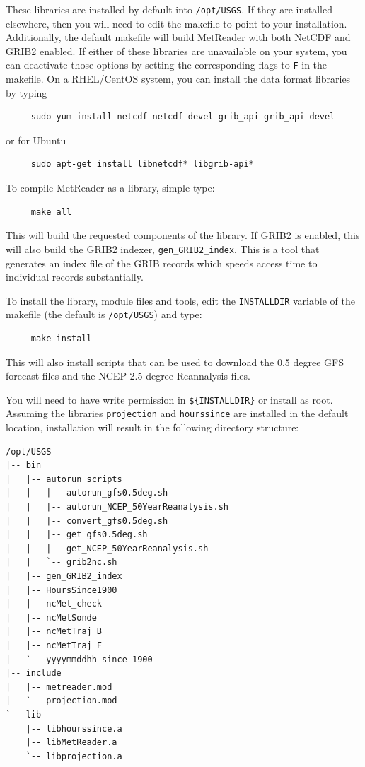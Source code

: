 \documentclass[11pt]{article}   %
\begin{document}
These libraries are installed by default into \texttt{/opt/USGS}.  If they are
installed elsewhere, then you will need to edit the makefile to point to your
installation.
Additionally, the default makefile will build MetReader with both NetCDF and GRIB2
enabled.  If either of these libraries are unavailable on your system, you can
deactivate those options by setting the corresponding flags to \texttt{F} in the makefile.
On a RHEL/CentOS system, you can install the data format libraries by typing
\begin{verbatim}
     sudo yum install netcdf netcdf-devel grib_api grib_api-devel
\end{verbatim}
or for Ubuntu
\begin{verbatim}
     sudo apt-get install libnetcdf* libgrib-api*
\end{verbatim}
To compile MetReader as a library, simple type:
\begin{verbatim}
     make all
\end{verbatim}
This will build the requested components of the library.  If GRIB2 is enabled,
this will also build the GRIB2 indexer, \texttt{gen\_GRIB2\_index}.
This is a tool that generates an index file of the GRIB records which speeds
access time to individual records substantially.

To install the library, module files and tools, edit the \texttt{INSTALLDIR} variable of
the makefile (the default is \texttt{/opt/USGS}) and type:
\begin{verbatim}
     make install
\end{verbatim}
This will also install scripts that can be used to download the 0.5 degree GFS
forecast files and the NCEP 2.5-degree Reannalysis files.

You will need to have write permission in \texttt{\$\{INSTALLDIR\}}
or install as root.  Assuming the libraries \texttt{projection} and \texttt{hourssince} are
installed in the default location, installation will result in the following
directory structure:
\begin{verbatim}
/opt/USGS
|-- bin
|   |-- autorun_scripts
|   |   |-- autorun_gfs0.5deg.sh
|   |   |-- autorun_NCEP_50YearReanalysis.sh
|   |   |-- convert_gfs0.5deg.sh
|   |   |-- get_gfs0.5deg.sh
|   |   |-- get_NCEP_50YearReanalysis.sh
|   |   `-- grib2nc.sh
|   |-- gen_GRIB2_index
|   |-- HoursSince1900
|   |-- ncMet_check
|   |-- ncMetSonde
|   |-- ncMetTraj_B
|   |-- ncMetTraj_F
|   `-- yyyymmddhh_since_1900
|-- include
|   |-- metreader.mod
|   `-- projection.mod
`-- lib
    |-- libhourssince.a
    |-- libMetReader.a
    `-- libprojection.a
\end{verbatim}
\end{document}
